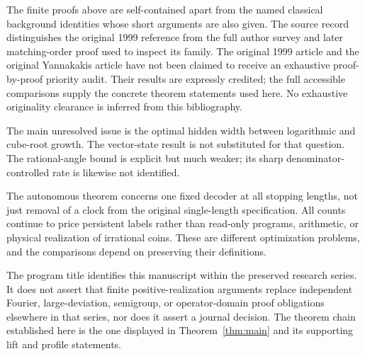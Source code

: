 The finite proofs above are self-contained apart from the named classical
background identities whose short arguments are also given. The source
record distinguishes the original 1999 reference from the full author
survey and later matching-order proof used to inspect its family. The
original 1999 article and the original Yannakakis article have not been
claimed to receive an exhaustive proof-by-proof priority audit. Their
results are expressly credited; the full accessible comparisons
\cite{BF03,CJM,FRT,VGG} supply the concrete theorem statements used here.
No exhaustive originality clearance is inferred from this bibliography.

The main unresolved issue is the optimal hidden width between logarithmic
and cube-root growth. The vector-state result is not substituted for that
question. The rational-angle bound is explicit but much weaker; its
sharp denominator-controlled rate is likewise not identified.

The autonomous theorem concerns one fixed decoder at all stopping lengths,
not just removal of a clock from the original single-length specification.
All counts continue to price persistent labels rather than read-only
programs, arithmetic, or physical realization of irrational coins.
These are different optimization problems, and the comparisons depend
on preserving their definitions.

The program title identifies this manuscript within the preserved research
series. It does not assert that finite positive-realization arguments
replace independent Fourier, large-deviation, semigroup, or operator-domain
proof obligations elsewhere in that series, nor does it assert a journal
decision. The theorem chain established here is the one displayed in
Theorem~\ref{thm:main} and its supporting lift and profile statements.
